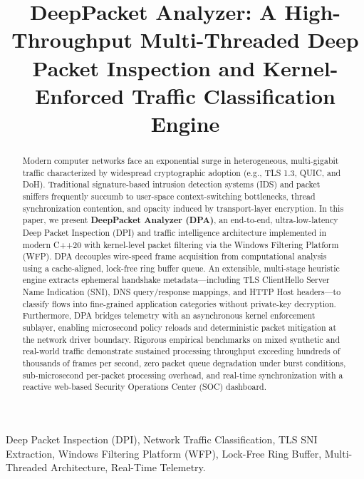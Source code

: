 \documentclass[conference]{IEEEtran}
\begin{document}
\title{DeepPacket Analyzer: A High-Throughput Multi-Threaded Deep Packet Inspection and Kernel-Enforced Traffic Classification Engine}

\author{
}

\maketitle

\begin{abstract}
Modern computer networks face an exponential surge in heterogeneous, multi-gigabit traffic characterized by widespread cryptographic adoption (e.g., TLS 1.3, QUIC, and DoH). Traditional signature-based intrusion detection systems (IDS) and packet sniffers frequently succumb to user-space context-switching bottlenecks, thread synchronization contention, and opacity induced by transport-layer encryption. In this paper, we present \textbf{DeepPacket Analyzer (DPA)}, an end-to-end, ultra-low-latency Deep Packet Inspection (DPI) and traffic intelligence architecture implemented in modern C++20 with kernel-level packet filtering via the Windows Filtering Platform (WFP). DPA decouples wire-speed frame acquisition from computational analysis using a cache-aligned, lock-free ring buffer queue. An extensible, multi-stage heuristic engine extracts ephemeral handshake metadata---including TLS ClientHello Server Name Indication (SNI), DNS query/response mappings, and HTTP Host headers---to classify flows into fine-grained application categories without private-key decryption. Furthermore, DPA bridges telemetry with an asynchronous kernel enforcement sublayer, enabling microsecond policy reloads and deterministic packet mitigation at the network driver boundary. Rigorous empirical benchmarks on mixed synthetic and real-world traffic demonstrate sustained processing throughput exceeding hundreds of thousands of frames per second, zero packet queue degradation under burst conditions, sub-microsecond per-packet processing overhead, and real-time synchronization with a reactive web-based Security Operations Center (SOC) dashboard.
\end{abstract}

\begin{IEEEkeywords}
Deep Packet Inspection (DPI), Network Traffic Classification, TLS SNI Extraction, Windows Filtering Platform (WFP), Lock-Free Ring Buffer, Multi-Threaded Architecture, Real-Time Telemetry.
\end{IEEEkeywords}
\end{document}
